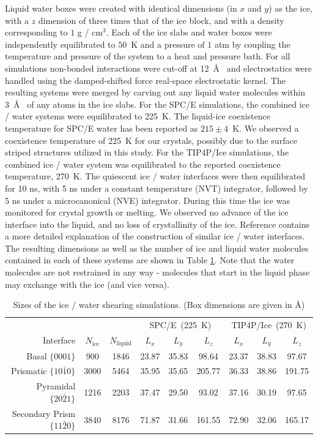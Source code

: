 Liquid water boxes were created with identical dimensions (in $x$ and
$y$) as the ice, with a $z$ dimension of three times that of the ice
block, and with a density corresponding to $1$ g / cm$^3$.  Each of
the ice slabs and water boxes were independently equilibrated to
$50$~K and a pressure of $1$ atm by coupling the temperature and
pressure of the system to a heat and pressure bath. For all
simulations non-bonded interactions were cut-off at 12~\AA~ and
electrostatics were handled using the damped-shifted force real-space
electrostatic kernel.\cite{Fennell2006} The resulting systems were
merged by carving out any liquid water molecules within 3~\AA~ of any
atoms in the ice slabs.  For the SPC/E simulations, the combined ice /
water systems were equilibrated to 225~K. The liquid-ice coexistence
temperature for SPC/E water has been reported as
$215 \pm 4$~K.\cite{Vega2006a,Fernandez2006} We observed a coexistence
temperature of 225~K for our crystals, possibly due to the surface
striped structures utilized in this study. For the TIP4P/Ice
simulations, the combined ice / water system was equilibrated to the
reported coexistence temperature, 270~K.\cite{Vega2006a,Fernandez2006}
The quiescent ice / water interfaces were then equilibrated for 10 ns,
with 5 ns under a constant temperature (NVT) integrator, followed by 5
ns under a microcanonical (NVE) integrator.  During this time the ice
was monitored for crystal growth or melting. We observed no advance of
the ice interface into the liquid, and no loss of crystallinity of the
ice. Reference  contains a more detailed
explanation of the construction of similar ice / water interfaces. The
resulting dimensions as well as the number of ice and liquid water
molecules contained in each of these systems are shown in Table
\ref{tab:sizes}.  Note that the water molecules are not restrained in
any way - molecules that start in the liquid phase may exchange with
the ice (and vice versa).

\begin{table}[h]
\centering
\caption{Sizes of the ice / water shearing simulations. (Box
  dimensions are given in \AA)\label{tab:sizes}}
\begin{tabular}{r|cc|ccc|ccc}
\toprule
 & & & \multicolumn{3}{c|}{SPC/E~(225~K)} &  \multicolumn{3}{c}{TIP4P/Ice~(270~K)}\\
 Interface & $N_\mathrm{ice}$ &
 $N_\mathrm{liquid}$ & $L_x$ & $L_y$ & $L_z$ & $L_x$ & $L_y$ & $L_z$ \\
\midrule
Basal  $\{0001\}$                 & 900 & 1846  & 23.87 & 35.83 & 98.64  & 23.37 & 38.83 & 97.67  \\
Prismatic  $\{10\bar{1}0\}$       & 3000 & 5464 & 35.95 & 35.65 & 205.77 & 36.33 & 38.86 & 191.75 \\
Pyramidal  $\{20\bar{2}1\}$       & 1216 & 2203 & 37.47 & 29.50 & 93.02  & 37.16 & 30.19 & 97.65  \\
Secondary Prism  $\{11\bar{2}0\}$ & 3840 & 8176 & 71.87 & 31.66 & 161.55 & 72.90 & 32.06 & 165.17 \\
\bottomrule
\end{tabular}
\end{table}


